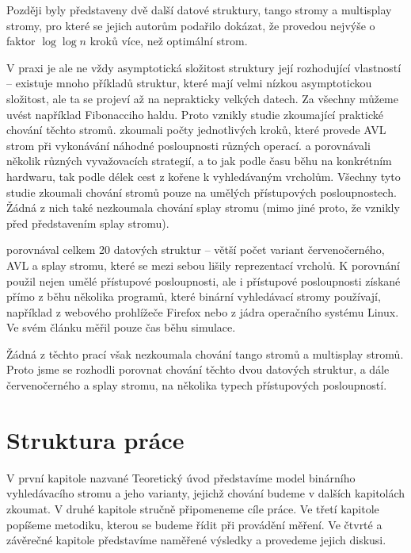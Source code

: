 Později byly představeny dvě další datové struktury, tango stromy a multisplay stromy, pro které se jejich autorům podařilo dokázat, že provedou nejvýše o faktor $\log\log n$ kroků více, než optimální strom.

V praxi je ale ne vždy asymptotická složitost struktury její rozhodující
vlastností -- existuje mnoho příkladů struktur, které mají velmi nízkou
asymptotickou složitost, ale ta se projeví až na neprakticky velkých datech. Za
všechny můžeme uvést například Fibonacciho haldu. Proto vznikly studie
zkoumající praktické chování těchto stromů. \citet{AVLperformance} zkoumali
počty jednotlivých kroků, které provede AVL strom při vykonávání náhodné
posloupnosti různých operací. \citet{comparison} a \citet{comparison2}
porovnávali několik různých vyvažovacích strategií, a to jak podle času běhu na konkrétním hardwaru, tak
podle délek cest z kořene k vyhledávaným vrcholům. Všechny tyto studie zkoumali
chování stromů pouze na umělých přístupových posloupnostech. Žádná z nich také
nezkoumala chování splay stromu (mimo jiné proto, že vznikly před představením
splay stromu).

\citet{performance} porovnával celkem 20 datových struktur -- větší počet variant červenočerného, AVL a splay stromu, které se mezi sebou lišily reprezentací vrcholů. K porovnání použil nejen umělé přístupové posloupnosti, ale i přístupové posloupnosti získané přímo z běhu několika programů, které binární vyhledávací stromy používají, například z webového prohlížeče Firefox nebo z jádra operačního systému Linux. Ve svém článku měřil pouze čas běhu simulace.

Žádná z těchto prací však nezkoumala chování tango stromů a multisplay stromů. Proto jsme se rozhodli porovnat chování těchto dvou datových struktur, a dále červenočerného a splay stromu, na několika typech přístupových posloupností.

\section*{Struktura práce}

V první kapitole nazvané Teoretický úvod představíme model binárního vyhledávacího stromu a jeho varianty, jejichž chování budeme v dalších kapitolách zkoumat. V druhé kapitole stručně připomeneme cíle práce. Ve třetí kapitole popíšeme metodiku, kterou se budeme řídit při provádění měření. Ve čtvrté a závěrečné kapitole představíme naměřené výsledky a provedeme jejich diskusi.
